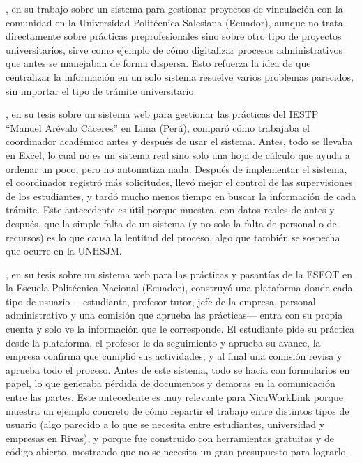\textcite{cordovacondor2024}, en su trabajo sobre un sistema para gestionar proyectos de vinculación con la comunidad en la Universidad Politécnica Salesiana (Ecuador), aunque no trata directamente sobre prácticas preprofesionales sino sobre otro tipo de proyectos universitarios, sirve como ejemplo de cómo digitalizar procesos administrativos que antes se manejaban de forma dispersa. Esto refuerza la idea de que centralizar la información en un solo sistema resuelve varios problemas parecidos, sin importar el tipo de trámite universitario.

\textcite{torresremon2022}, en su tesis sobre un sistema web para gestionar las prácticas del IESTP ``Manuel Arévalo Cáceres'' en Lima (Perú), comparó cómo trabajaba el coordinador académico antes y después de usar el sistema. Antes, todo se llevaba en Excel, lo cual no es un sistema real sino solo una hoja de cálculo que ayuda a ordenar un poco, pero no automatiza nada. Después de implementar el sistema, el coordinador registró más solicitudes, llevó mejor el control de las supervisiones de los estudiantes, y tardó mucho menos tiempo en buscar la información de cada trámite. Este antecedente es útil porque muestra, con datos reales de antes y después, que la simple falta de un sistema (y no solo la falta de personal o de recursos) es lo que causa la lentitud del proceso, algo que también se sospecha que ocurre en la UNHSJM.

\textcite{tene2021}, en su tesis sobre un sistema web para las prácticas y pasantías de la ESFOT en la Escuela Politécnica Nacional (Ecuador), construyó una plataforma donde cada tipo de usuario ---estudiante, profesor tutor, jefe de la empresa, personal administrativo y una comisión que aprueba las prácticas--- entra con su propia cuenta y solo ve la información que le corresponde. El estudiante pide su práctica desde la plataforma, el profesor le da seguimiento y aprueba su avance, la empresa confirma que cumplió sus actividades, y al final una comisión revisa y aprueba todo el proceso. Antes de este sistema, todo se hacía con formularios en papel, lo que generaba pérdida de documentos y demoras en la comunicación entre las partes. Este antecedente es muy relevante para NicaWorkLink porque muestra un ejemplo concreto de cómo repartir el trabajo entre distintos tipos de usuario (algo parecido a lo que se necesita entre estudiantes, universidad y empresas en Rivas), y porque fue construido con herramientas gratuitas y de código abierto, mostrando que no se necesita un gran presupuesto para lograrlo.

